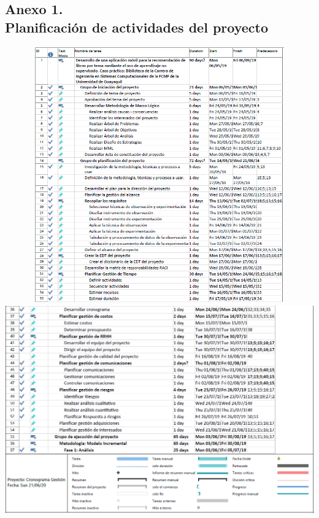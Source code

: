 \documentclass[12pt, a4paper, nofontenc, numbers=endperiod]{apa7}
\begin{document}
{\subsection*{\normalsize \centering Anexo 1. \\ Planificación de actividades del proyecto}
\begin{center}
	\includegraphics[width=14cm,height=11cm]{Imagenes/Figura32}\\
	\includegraphics[width=14cm,height=9cm]{Imagenes/Figura33}
\end{center}
\vspace*{-1cm}
\begin{center}

\end{center}}
\end{document}
